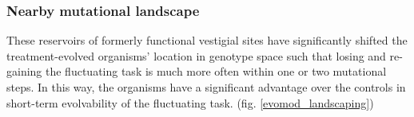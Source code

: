 \subsubsection{Nearby mutational landscape} 
These reservoirs of formerly functional vestigial sites have significantly shifted the treatment-evolved organisms' location in genotype space such that losing and re-gaining the fluctuating task is much more often within one or two mutational steps. In this way, the organisms have a significant advantage over the controls in short-term evolvability of the fluctuating task. (fig. \ref{evomod_landscaping})
